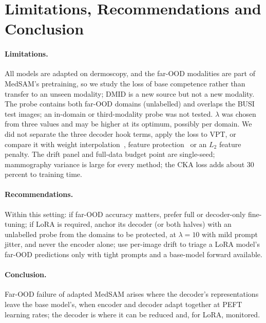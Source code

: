 \section{Limitations, Recommendations and Conclusion}
\label{sec:limits}

\paragraph{Limitations.}
All models are adapted on dermoscopy, and the far-OOD modalities are part of MedSAM's pretraining, so we study the loss of base competence rather than transfer to an unseen modality; DMID is a new source but not a new modality. The probe contains both far-OOD domains (unlabelled) and overlaps the BUSI test images; an in-domain or third-modality probe was not tested. $\lambda$ was chosen from three values and may be higher at its optimum, possibly per domain. We did not separate the three decoder hook terms, apply the loss to VPT, or compare it with weight interpolation~\cite{wortsman2022wiseft}, feature protection~\cite{tan2024protection} or an $L_2$ feature penalty. The drift panel and full-data budget point are single-seed; mammography variance is large for every method; the CKA loss adds about 30 percent to training time.

\paragraph{Recommendations.}
Within this setting: if far-OOD accuracy matters, prefer full or decoder-only fine-tuning; if LoRA is required, anchor its decoder (or both halves) with an unlabelled probe from the domains to be protected, at $\lambda = 10$ with mild prompt jitter, and never the encoder alone; use per-image drift to triage a LoRA model's far-OOD predictions only with tight prompts and a base-model forward available.

\paragraph{Conclusion.}
Far-OOD failure of adapted MedSAM arises where the decoder's representations leave the base model's, when encoder and decoder adapt together at PEFT learning rates; the decoder is where it can be reduced and, for LoRA, monitored.
